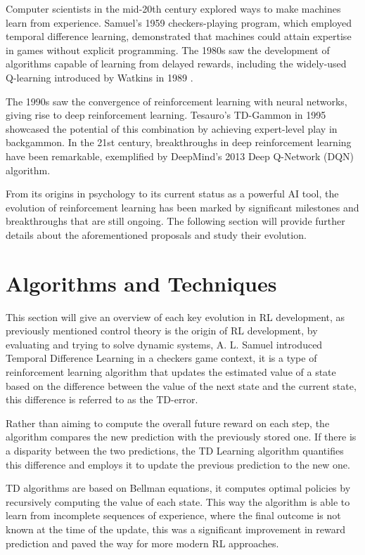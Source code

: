 Computer scientists in the mid-20th century explored ways to make machines learn from experience. Samuel's 1959 checkers-playing program, which employed temporal difference learning\cite{}, demonstrated that machines could attain expertise in games without explicit programming. The 1980s saw the development of algorithms capable of learning from delayed rewards, including the widely-used Q-learning introduced by Watkins in 1989 \cite{}.

The 1990s saw the convergence of reinforcement learning with neural networks, giving rise to deep reinforcement learning. Tesauro's TD-Gammon in 1995 showcased the potential of this combination by achieving expert-level play in backgammon\cite{}. In the 21st century, breakthroughs in deep reinforcement learning have been remarkable, exemplified by DeepMind's 2013 Deep Q-Network (DQN) algorithm\cite{}.

From its origins in psychology to its current status as a powerful AI tool, the evolution of reinforcement learning has been marked by significant milestones and breakthroughs that are still ongoing. The following section will provide further details about the aforementioned proposals and study their evolution.

\section{Algorithms and Techniques}\label{sec:rl-algorithms_and_techniques}
This section will give an overview of each key evolution in RL development, as previously mentioned control theory is the origin of RL development, by evaluating and trying to solve dynamic systems, A. L. Samuel introduced Temporal Difference Learning \cite{samuel1959checkers} in a checkers game context, it is a type of reinforcement learning algorithm that updates the estimated value of a state based on the difference between the value of the next state and the current state, this difference is referred to as the TD-error.

Rather than aiming to compute the overall future reward on each step, the algorithm compares the new prediction with the previously stored one. If there is a disparity between the two predictions, the TD Learning algorithm quantifies this difference and employs it to update the previous prediction to the new one.

TD algorithms are based on Bellman equations, it computes optimal policies by recursively computing the value of each state. This way the algorithm is able to learn from incomplete sequences of experience, where the final outcome is not known at the time of the update, this was a significant improvement in reward prediction and paved the way for more modern RL approaches. 

